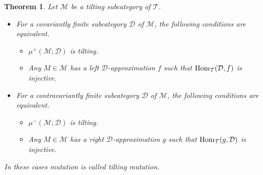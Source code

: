 \documentclass[a4paper,reqno]{amsart}
\newtheorem{theorem}{Theorem}[section]
\theoremstyle{definition}
\newcommand{\DD}{{\mathcal D}}
\newcommand{\TT}{{\mathcal T}}
\newcommand{\MM}{{\mathcal M}}
\newcommand{\XX}{{\mathcal X}}
\newcommand{\homo}[3]{{\rm{Hom}}_{#1}(#2, #3)} %
\begin{document}
\begin{theorem}\label{when silting is tilting}
Let $\MM$ be a tilting subcategory of $\TT$.
\begin{itemize}
\item[(a)] For a covariantly finite subcategory $\DD$ of $\MM$, the following conditions are equivalent.
\begin{itemize}
\item[(i)] $\mu^+(\MM;\DD)$ is tilting.
\item[(ii)] Any $M\in\MM$ has a left $\DD$-approximation $f$ such that
$\homo{\TT}{\DD}{f}$ is injective.
\end{itemize}
\item[(b)] For a contravariantly finite subcategory $\DD$ of $\MM$, the following conditions are equivalent.
\begin{itemize}
\item[(i)] $\mu^-(\MM;\DD)$ is tilting.
\item[(ii)] Any $M\in\MM$ has a right $\DD$-approximation $g$ such that
$\homo{\TT}{g}{\DD}$ is injective.
\end{itemize}
\end{itemize}
In these cases mutation is called \emph{tilting mutation}.
\end{theorem}
\end{document}
